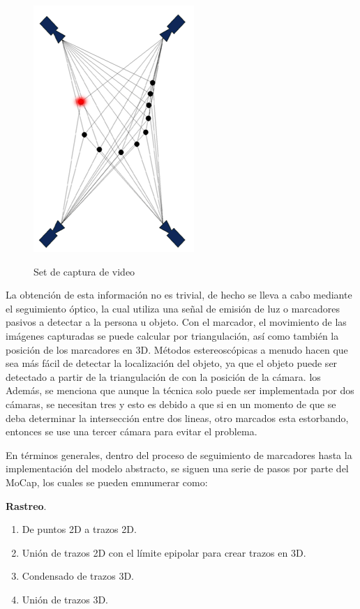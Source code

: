 \documentclass[11pt,letterpaper]{article}     %
\begin{document}
\begin{figure}[hbtp]
\caption{Set de captura de video}
\centering
\includegraphics[scale=1]{imagenes/ppt_area.png}
\label{fig:4camaras}
\end{figure}


La obtenci\' on de esta informaci\' on no es trivial, de hecho se lleva a cabo mediante el seguimiento óptico, la cual utiliza una señal de emisión de luz o marcadores pasivos a detectar a la persona u objeto. Con el marcador, el movimiento de las imágenes capturadas  se puede calcular por triangulación, as\' i como tambi\' en la posición de los marcadores en 3D. 
Métodos estereoscópicas a menudo hacen que sea más fácil de detectar la localizaci\' on del objeto, ya que el objeto puede ser detectado a partir de la triangulación de con la posición de la cámara.
los 
Adem\' as, se menciona que aunque la t\' ecnica solo puede ser implementada por dos c\' amaras, se necesitan tres y esto es debido a que si en un momento de que se deba determinar la intersecci\' on entre dos lineas, otro marcados esta estorbando, entonces se use una tercer c\' amara para evitar el problema.

En t\' erminos generales, dentro del proceso de seguimiento de marcadores hasta la implementaci\' on del modelo abstracto, se siguen una serie de pasos por parte del MoCap, los cuales se pueden emnumerar como:

\textbf{Rastreo}.
\begin{enumerate} 
\item De puntos 2D a trazos 2D.
\item Uni\' on de trazos 2D con el l\' imite epipolar para crear trazos en 3D.
\item Condensado de trazos 3D.
\item Uni\' on de trazos 3D.
\end{enumerate}
\end{document}
